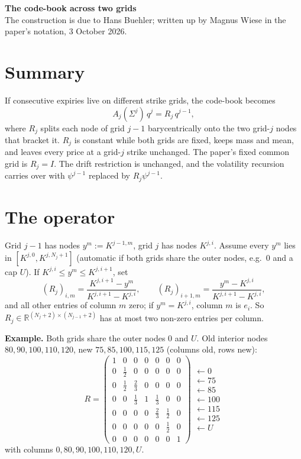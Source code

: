 \documentclass[11pt,a4paper]{article}
\newcommand{\R}{\mathbb R}
\newcommand{\dlv}{\Sigma}
\begin{document}
\begin{center}
{\large\bfseries The code-book across two grids}\\[0.2em]
{\small The construction is due to Hans Buehler; written up by Magnus Wiese in the paper's notation, 3 October 2026.}
\end{center}

\section*{Summary}
If consecutive expiries live on different strike grids, the code-book becomes
\begin{equation}\label{eq:cb}
  A_j(\dlv^j)\,q^j=R_j\,q^{j-1},
\end{equation}
where $R_j$ splits each node of grid $j-1$ barycentrically onto the two grid-$j$ nodes that
bracket it. $R_j$ is constant while both grids are fixed, keeps mass and mean, and leaves
every price at a grid-$j$ strike unchanged. The paper's fixed common grid is $R_j=I$. The drift restriction is
unchanged, and the volatility recursion carries over with $\psi^{j-1}$ replaced by
$R_j\psi^{j-1}$.

\section{The operator}
Grid $j-1$ has nodes $y^m:=K^{j-1,m}$, grid $j$ has nodes $K^{j,i}$. Assume every $y^m$ lies in
$[K^{j,0},K^{j,N_j+1}]$ (automatic if both grids share the outer nodes, e.g.\ $0$ and a cap
$U$). If $K^{j,i}\le y^m\le K^{j,i+1}$, set
\begin{equation}\label{eq:R}
  (R_j)_{i,m}=\frac{K^{j,i+1}-y^m}{K^{j,i+1}-K^{j,i}},\qquad
  (R_j)_{i+1,m}=\frac{y^m-K^{j,i}}{K^{j,i+1}-K^{j,i}},
\end{equation}
and all other entries of column $m$ zero; if $y^m=K^{j,i}$, column $m$ is $e_i$. So
$R_j\in\R^{(N_j+2)\times(N_{j-1}+2)}$ has at most two non-zero entries per column.

\textbf{Example.} Both grids share the outer nodes $0$ and $U$. Old interior nodes
$80,90,100,110,120$, new $75,85,100,115,125$ (columns old, rows new):
\[
  R=\begin{pmatrix}
    1&0&0&0&0&0&0\\[1pt]
    0&\tfrac12&0&0&0&0&0\\[1pt]
    0&\tfrac12&\tfrac23&0&0&0&0\\[1pt]
    0&0&\tfrac13&1&\tfrac13&0&0\\[1pt]
    0&0&0&0&\tfrac23&\tfrac12&0\\[1pt]
    0&0&0&0&0&\tfrac12&0\\[1pt]
    0&0&0&0&0&0&1
  \end{pmatrix}
  \begin{matrix}\leftarrow0\\ \leftarrow75\\ \leftarrow85\\ \leftarrow100\\ \leftarrow115\\ \leftarrow125\\ \leftarrow U\end{matrix}
\]
with columns $0,80,90,100,110,120,U$.
\end{document}
